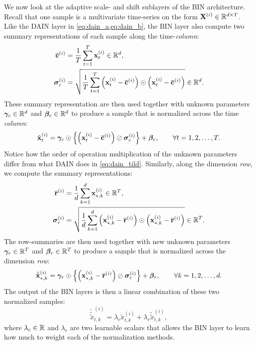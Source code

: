 \documentclass{statsmsc}
\begin{document}
{We now look at the adaptive scale- and shift sublayers of the \ac{BIN} architecture.
Recall that one sample is a multivariate time-series on the form $\mathbf{X}^{(i)} \in \mathbb{R}^{d \times T}$.
Like the \ac{DAIN} layer in \cref{eq:dain_a,eq:dain_b}, the \ac{BIN} layer also
compute two summary representations of each sample along the time-\textit{column}:
\begin{align}
    \overline{\mathbf{c}}^{(i)}& =\frac{1}{T} \sum^{T}_{t=1} \mathbf{x}_t^{(i)} \in \mathbb{R}^d, \\
    \bm\sigma_c^{(i)}&=\sqrt{
    \frac{1}{T} \sum^{T}_{t=1} \left(\mathbf{x}^{(i)}_{t} - \overline{\mathbf{c}}^{(i)} \right)
    \odot \left(\mathbf{x}^{(i)}_{t} - \overline{\mathbf{c}}^{(i)} \right)
} \in \mathbb{R}^d.
\end{align}
These summary representation are then used together with unknown parameters
$\bm\gamma_c \in \mathbb{R}^d$ and $\bm\beta_c \in \mathbb{R}^d$ to produce a sample that is normalized across
the time \textit{column}:
\begin{equation}
    \tilde{\mathbf{x}}^{(i)}_t= \bm\gamma_c \odot \left\{
        \left(\mathbf{x}^{(i)}_t - \overline{\mathbf{c}}^{(i)}\right)\oslash \bm\sigma_c^{(i)}
    \right\}+\bm\beta_c, \qquad \forall t=1,2,\dots,T.
\end{equation}
Notice how the order of operation multiplication of the unknown parameters differ from what
\ac{DAIN} does in \cref{eq:dain_tild}. Similarly, along the dimension \textit{row}, we compute
the summary representations:
\begin{align}
    \overline{\mathbf{r}}^{(i)}& =\frac{1}{d} \sum^{d}_{k=1} \mathbf{x}_{*,k}^{(i)} \in \mathbb{R}^T, \\
    \bm\sigma_r^{(i)}&=\sqrt{
        \frac{1}{d} \sum^{d}_{k=1} \left(\mathbf{x}^{(i)}_{*,k} - \overline{\mathbf{r}}^{(i)} \right)
        \odot \left(\mathbf{x}^{(i)}_{*,k} - \overline{\mathbf{r}}^{(i)} \right)
    } \in \mathbb{R}^T.
\end{align}
The row-summaries are then used together with new unknown parameters
$\bm\gamma_r \in \mathbb{R}^T$ and $\bm\beta_r \in \mathbb{R}^T$ to produce
a sample that is normalized across the dimension \textit{row}:
\begin{equation}
    \tilde{\tilde{\mathbf{x}}}^{(i)}_{*,k}= \bm\gamma_r \odot \left\{
        \left(\mathbf{x}^{(i)}_{*,k} - \overline{\mathbf{r}}^{(i)}\right)\oslash \bm\sigma_r^{(i)}
    \right\}+\bm\beta_r, \qquad \forall k=1,2,\dots,d.
\end{equation}
The output of the \ac{BIN} layers is then a linear combination of these two normalized samples:
\begin{equation}
    \tilde{\tilde{\tilde{x} }}^{(i)}_{t,k} = \lambda_c \tilde{x}^{(i)}_{t,k}
    + \lambda_r \tilde{\tilde{x}}^{(i)}_{t,k},
\end{equation}
where $\lambda_c \in \mathbb{R}$ and $\lambda_r$ are two learnable scalars that allows the \ac{BIN} layer
to learn how much to weight each of the normalization methods.


}
\end{document}
